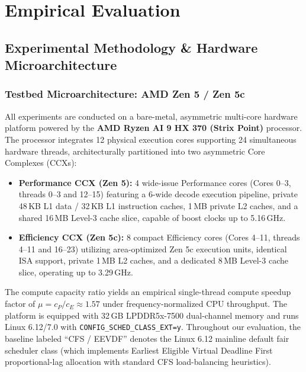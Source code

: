 \documentclass[letterpaper,twocolumn,10pt]{article}
\begin{document}
\section{Empirical Evaluation}
\label{sec:evaluation}

\subsection{Experimental Methodology \& Hardware Microarchitecture}
\label{sec:testbed_hardware}

\subsubsection{Testbed Microarchitecture: AMD Zen 5 / Zen 5c}
All experiments are conducted on a bare-metal, asymmetric multi-core hardware platform powered by the \textbf{AMD Ryzen AI 9 HX 370 (Strix Point)} processor. The processor integrates 12 physical execution cores supporting 24 simultaneous hardware threads, architecturally partitioned into two asymmetric Core Complexes (CCXs):
\begin{itemize}\setlength{\itemsep}{1pt}\setlength{\parskip}{0pt}
    \item \textbf{Performance CCX (Zen 5):} 4 wide-issue Performance cores (Cores 0--3, threads 0--3 and 12--15) featuring a 6-wide decode execution pipeline, private 48\,KB L1 data / 32\,KB L1 instruction caches, 1\,MB private L2 caches, and a shared 16\,MB Level-3 cache slice, capable of boost clocks up to 5.16\,GHz.
    \item \textbf{Efficiency CCX (Zen 5c):} 8 compact Efficiency cores (Cores 4--11, threads 4--11 and 16--23) utilizing area-optimized Zen 5c execution units, identical ISA support, private 1\,MB L2 caches, and a dedicated 8\,MB Level-3 cache slice, operating up to 3.29\,GHz.
\end{itemize}
The compute capacity ratio yields an empirical single-thread compute speedup factor of $\mu = c_P / c_E \approx 1.57$ under frequency-normalized CPU throughput. The platform is equipped with 32\,GB LPDDR5x-7500 dual-channel memory and runs Linux 6.12/7.0 with \texttt{CONFIG\_SCHED\_CLASS\_EXT=y}. Throughout our evaluation, the baseline labeled ``CFS / EEVDF'' denotes the Linux 6.12 mainline default fair scheduler class (which implements Earliest Eligible Virtual Deadline First proportional-lag allocation with standard CFS load-balancing heuristics).
\end{document}
